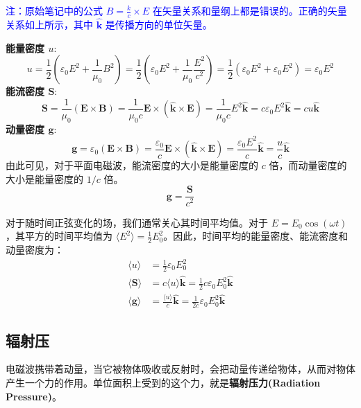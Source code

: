 \documentclass[fontset=none]{ctexart}
\begin{document}
\textcolor{blue}{注：原始笔记中的公式 $B = \frac{k}{c} \times E$ 在矢量关系和量纲上都是错误的。正确的矢量关系如上所示，其中 $\hat{\bm{k}}$ 是传播方向的单位矢量。}

\textbf{能量密度 $u$}:
\begin{equation}
    u = \frac{1}{2}(\varepsilon_0 E^2 + \frac{1}{\mu_0}B^2) = \frac{1}{2}\left(\varepsilon_0 E^2 + \frac{1}{\mu_0}\frac{E^2}{c^2}\right) = \frac{1}{2}(\varepsilon_0 E^2 + \varepsilon_0 E^2) = \varepsilon_0 E^2
\end{equation}
\textbf{能流密度 $\bm{S}$}:
\begin{equation}
    \bm{S} = \frac{1}{\mu_0}(\bm{E} \times \bm{B}) = \frac{1}{\mu_0 c}\bm{E} \times (\hat{\bm{k}} \times \bm{E}) = \frac{1}{\mu_0 c} E^2 \hat{\bm{k}} = c \varepsilon_0 E^2 \hat{\bm{k}} = c u \hat{\bm{k}}
\end{equation}
\textbf{动量密度 $\bm{g}$}:
\begin{equation}
    \bm{g} = \varepsilon_0(\bm{E} \times \bm{B}) = \frac{\varepsilon_0}{c}\bm{E} \times (\hat{\bm{k}} \times \bm{E}) = \frac{\varepsilon_0 E^2}{c}\hat{\bm{k}} = \frac{u}{c}\hat{\bm{k}}
\end{equation}
由此可见，对于平面电磁波，能流密度的大小是能量密度的 $c$ 倍，而动量密度的大小是能量密度的 $1/c$ 倍。
\begin{equation}
    \bm{g} = \frac{\bm{S}}{c^2}
\end{equation}

对于随时间正弦变化的场，我们通常关心其时间平均值。对于 $E = E_0 \cos(\omega t)$，其平方的时间平均值为 $\langle E^2 \rangle = \frac{1}{2}E_0^2$。因此，时间平均的能量密度、能流密度和动量密度为：
\begin{equation}
\begin{aligned}
    \langle u \rangle &= \frac{1}{2}\varepsilon_0 E_0^2 \\
    \langle \bm{S} \rangle &= c \langle u \rangle \hat{\bm{k}} = \frac{1}{2}c\varepsilon_0 E_0^2 \hat{\bm{k}} \\
    \langle \bm{g} \rangle &= \frac{\langle u \rangle}{c} \hat{\bm{k}} = \frac{1}{2c}\varepsilon_0 E_0^2 \hat{\bm{k}}
\end{aligned}
\end{equation}

\subsection{辐射压}
电磁波携带着动量，当它被物体吸收或反射时，会把动量传递给物体，从而对物体产生一个力的作用。单位面积上受到的这个力，就是\textbf{辐射压力(Radiation Pressure)}。
\end{document}
